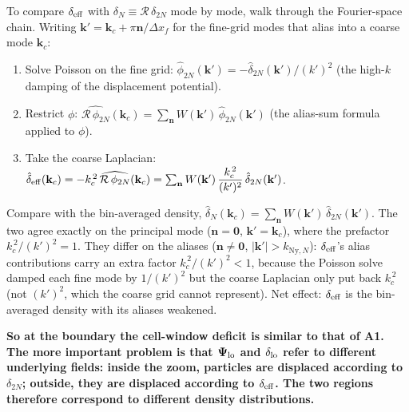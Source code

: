\documentclass[12pt]{article}
\newcommand{\R}{\mathcal{R}}
\begin{document}
To compare $\delta_{\rm eff}$ with $\delta_N\equiv\R\,\delta_{2N}$
mode by mode, walk through the Fourier-space chain. Writing
$\mathbf k' = \mathbf k_c + \pi\mathbf n/\Delta x_f$ for the fine-grid
modes that alias into a coarse mode $\mathbf k_c$:
\begin{enumerate}
\item Solve Poisson on the fine grid:
      $\hat\phi_{2N}(\mathbf k') = -\hat\delta_{2N}(\mathbf k')/(k')^2$
      (the high-$k$ damping of the displacement potential).
\item Restrict $\phi$:
      $\widehat{\R\,\phi_{2N}}(\mathbf k_c) =
      \sum_{\mathbf n} W(\mathbf k')\,\hat\phi_{2N}(\mathbf k')$
      (the alias-sum formula applied to $\phi$).
\item Take the coarse Laplacian:
      $\hat\delta_{\rm eff}(\mathbf k_c)
      = -k_c^{\,2}\,\widehat{\R\,\phi_{2N}}(\mathbf k_c)
      = \sum_{\mathbf n} W(\mathbf k')\,\dfrac{k_c^{\,2}}{(k')^{2}}\,
        \hat\delta_{2N}(\mathbf k')$.
\end{enumerate}
Compare with the bin-averaged density,
$\hat\delta_N(\mathbf k_c) = \sum_{\mathbf n}
W(\mathbf k')\,\hat\delta_{2N}(\mathbf k')$. The two agree exactly on
the principal mode ($\mathbf n=\mathbf 0$, $\mathbf k'=\mathbf k_c$),
where the prefactor $k_c^{\,2}/(k')^{2}=1$. They differ on the
aliases ($\mathbf n\ne\mathbf 0$, $|\mathbf k'|>k_{\mathrm{Ny},N}$):
$\delta_{\rm eff}$'s alias contributions carry an extra factor
$k_c^{\,2}/(k')^{2}<1$, because the Poisson solve damped each fine
mode by $1/(k')^2$ but the coarse Laplacian only put back $k_c^{\,2}$
(not $(k')^2$, which the coarse grid cannot represent). Net effect:
$\delta_{\rm eff}$ is the bin-averaged density with its aliases
weakened.

\textbf{So at the boundary the cell-window deficit is similar to that of A1.
The more important problem is that $\boldsymbol{\Psi}_{\rm lo}$ and
$\delta_{\rm lo}$ refer to different underlying fields: inside the
zoom, particles are displaced according to $\delta_{2N}$; outside,
they are displaced according to $\delta_{\rm eff}$. The two regions
therefore correspond to different density distributions.}
\end{document}
